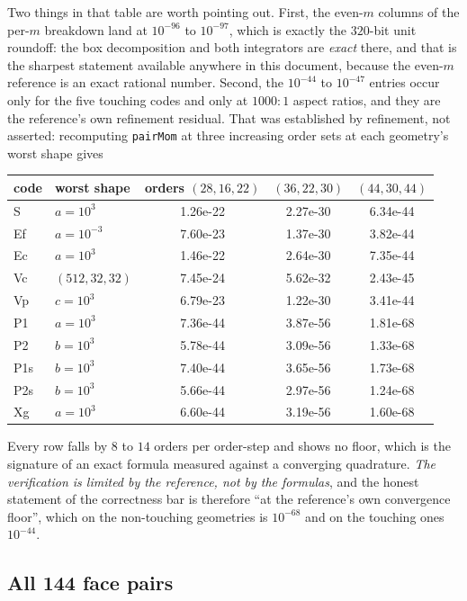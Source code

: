 \documentclass[11pt]{article}
\theoremstyle{remark}
\newcommand{\code}[1]{\texttt{#1}}
\begin{document}
Two things in that table are worth pointing out. First, the even-$m$ columns of the
per-$m$ breakdown land at $10^{-96}$ to $10^{-97}$, which is exactly the $320$-bit unit
roundoff: the box decomposition and both integrators are \emph{exact} there, and that is
the sharpest statement available anywhere in this document, because the even-$m$ reference
is an exact rational number. Second, the $10^{-44}$ to $10^{-47}$ entries occur only for
the five touching codes and only at $1000{:}1$ aspect ratios, and they are the reference's
own refinement residual. That was established by refinement, not asserted: recomputing
\code{pairMom} at three increasing order sets at each geometry's worst shape gives

\begin{center}\small
\begin{tabular}{@{}llccc@{}}
\toprule
code & worst shape & orders $(28,16,22)$ & $(36,22,30)$ & $(44,30,44)$\\
\midrule
S   & $a = 10^{3}$    & 1.26e-22 & 2.27e-30 & 6.34e-44\\
Ef  & $a = 10^{-3}$   & 7.60e-23 & 1.37e-30 & 3.82e-44\\
Ec  & $a = 10^{3}$    & 1.46e-22 & 2.64e-30 & 7.35e-44\\
Vc  & $(512,32,32)$   & 7.45e-24 & 5.62e-32 & 2.43e-45\\
Vp  & $c = 10^{3}$    & 6.79e-23 & 1.22e-30 & 3.41e-44\\
P1  & $a = 10^{3}$    & 7.36e-44 & 3.87e-56 & 1.81e-68\\
P2  & $b = 10^{3}$    & 5.78e-44 & 3.09e-56 & 1.33e-68\\
P1s & $b = 10^{3}$    & 7.40e-44 & 3.65e-56 & 1.73e-68\\
P2s & $b = 10^{3}$    & 5.66e-44 & 2.97e-56 & 1.24e-68\\
Xg  & $a = 10^{3}$    & 6.60e-44 & 3.19e-56 & 1.60e-68\\
\bottomrule
\end{tabular}
\end{center}
\noindent
Every row falls by $8$ to $14$ orders per order-step and shows no floor, which is the
signature of an exact formula measured against a converging quadrature. \emph{The
verification is limited by the reference, not by the formulas}, and the honest statement of
the correctness bar is therefore ``at the reference's own convergence floor'', which on the
non-touching geometries is $10^{-68}$ and on the touching ones $10^{-44}$.

\subsection{All 144 face pairs}
\end{document}

